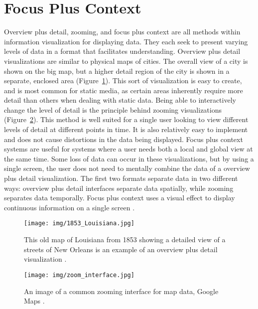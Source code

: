 \section{Focus Plus Context}
\label{section:intro_fac}
Overview plus detail, zooming, and focus plus context are all methods within information visualization for displaying data. They each seek to present varying levels of data in a format that facilitates understanding. Overview plus detail visualizations are similar to physical maps of cities. The overall view of a city is shown on the big map, but a higher detail region of the city is shown in a separate, enclosed area (Figure~\ref{fig:louisiana}). This sort of visualization is easy to create, and is most
common for static media, as certain areas inherently require more detail than others when dealing with static data. Being able to interactively change the level of detail is the principle behind zooming visualizations (Figure~\ref{fig:google_maps}). This method is well suited for a single user looking to view different levels of detail at different points in time. It is also relatively easy to implement and does not cause distortions in the data being displayed. Focus plus context systems are useful for systems
where a user needs both a local and global view at the same time. Some loss of data can occur in these visualizations, but by using a single screen, the user does not need to mentally combine the data of a overview plus detail visualization. The first two formats separate data in two
different ways: overview plus detail interfaces separate data spatially, while zooming separates data temporally. Focus plus context uses a visual effect to display continuous information on a single screen \cite{Cockburn2008}. 

\begin{figure}[htp] \centering
    \texttt{[image: img/1853\_Louisiana.jpg]}
    \caption[Overview Plus Detail]{This old map of Louisiana from 1853 showing a detailed view of a streets of New Orleans is an example of an overview plus detail visualization \cite{Mitchell1853}.}
    \label{fig:louisiana}
\end{figure}

\begin{figure}[htp] \centering
    \texttt{[image: img/zoom\_interface.jpg]}
    \caption[Zooming Interface]{An image of a common zooming interface for map data, Google Maps \cite{google_maps}.}
    \label{fig:google_maps}
\end{figure}

